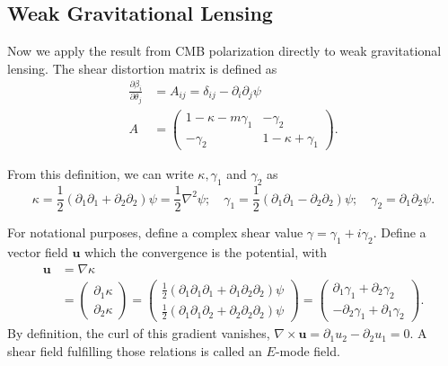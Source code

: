 \subsection{Weak Gravitational Lensing}

Now we apply the result from CMB polarization directly to weak gravitational lensing. The shear distortion matrix is defined as
\begin{align}
    \label{eq:shear_dist}
    \frac{\partial \beta_i}{\partial \theta_j} &= A_{ij} = \delta_{ij} - \partial_i \partial_j \psi \\
    A &= \begin{pmatrix}
        1 - \kappa -m\gamma_1 & -\gamma_2 \\
        -\gamma_2 & 1 - \kappa + \gamma_1
    \end{pmatrix}.
\end{align}

From this definition, we can write $\kappa, \gamma_1$ and $\gamma_2$ as
\begin{equation}
    \label{eq:shear_kg1g2}
    \kappa = \frac{1}{2}(\partial_1\partial_1 + \partial_2\partial_2)\psi = \frac{1}{2}\nabla^2\psi; \quad \gamma_1 = \frac{1}{2}(\partial_1\partial_1 - \partial_2\partial_2)\psi; \quad \gamma_2=\partial_1\partial_2\psi.
\end{equation}

For notational purposes, define a complex shear value $\gamma = \gamma_1 + i \gamma_2$. Define a vector field $\bm{u}$ which the convergence is the potential, with
\begin{align}
    \label{eq:shear_u}
    \nonumber \bm{u} &= \nabla \kappa \\
    &= \begin{pmatrix}
        \partial_1 \kappa \\
        \partial_2 \kappa
    \end{pmatrix}
    = \begin{pmatrix}
        \frac{1}{2}(\partial_1\partial_1\partial_1 + \partial_1\partial_2\partial_2)\psi\\
        \frac{1}{2}(\partial_1\partial_1\partial_2 + \partial_2\partial_2\partial_2)\psi
    \end{pmatrix}
    = \begin{pmatrix}
        \partial_1\gamma_1 + \partial_2\gamma_2 \\
        -\partial_2\gamma_1 + \partial_1\gamma_2
    \end{pmatrix}.
\end{align}
By definition, the curl of this gradient vanishes, $\nabla \times \bm{u} = \partial_1 u_2 - \partial_2 u_1 = 0$. A shear field fulfilling those relations is called an $E$-mode field.

